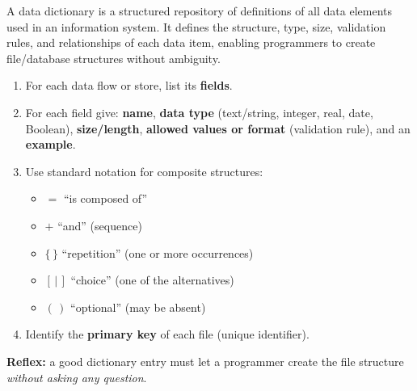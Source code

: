 \documentclass[11pt]{article}
\newcommand{\cle}[1]{{\popxbold\color{popdark}#1}}
\begin{document}
\begin{definition}
A \cle{data dictionary} is a structured repository of definitions of all data elements used in an information system. It defines the structure, type, size, validation rules, and relationships of each data item, enabling programmers to create file/database structures without ambiguity.
\end{definition}

\begin{methode}
\begin{enumerate}
\item For each data flow or store, list its \textbf{fields}.
\item For each field give: \textbf{name}, \textbf{data type} (text/string, integer, real, date, Boolean), \textbf{size/length}, \textbf{allowed values or format} (validation rule), and an \textbf{example}.
\item Use standard notation for composite structures:
\begin{itemize}
\item $=$ ``is composed of''
\item $+$ ``and'' (sequence)
\item $\{\,\}$ ``repetition'' (one or more occurrences)
\item $[\,|\,]$ ``choice'' (one of the alternatives)
\item $(\,)$ ``optional'' (may be absent)
\end{itemize}
\item Identify the \textbf{primary key} of each file (unique identifier).
\end{enumerate}
\textbf{Reflex:} a good dictionary entry must let a programmer create the file structure \emph{without asking any question}.
\end{methode}
\end{document}
